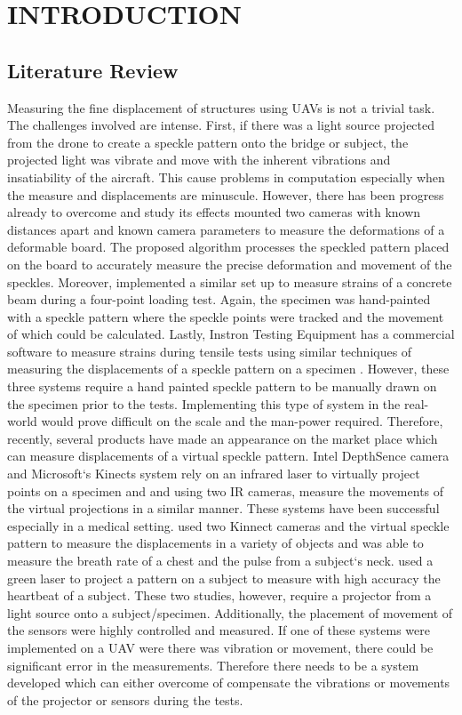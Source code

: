 \documentclass{sigchi}
\begin{document}
\section{INTRODUCTION}

\subsection{Literature Review}

Measuring the fine displacement of structures using UAVs is not a trivial task. The challenges involved are intense. First, if there was a light source projected from the drone to create a speckle pattern onto the bridge or subject, the projected light was vibrate and move with the inherent vibrations and insatiability of the aircraft. This cause problems in computation especially when the measure and displacements are minuscule. However, there has been progress already to overcome and study its effects \cite{Baqersad2019Development} mounted two cameras with known distances apart and known camera parameters to measure the deformations of a deformable board. The proposed algorithm processes the speckled pattern placed on the board to accurately measure the precise deformation and movement of the speckles. Moreover, \cite{KalaitzakisDynamicDrone} implemented a similar set up to measure strains of a concrete beam during a four-point loading test. Again, the specimen was hand-painted with a speckle pattern where the speckle points were tracked and the movement of which could be calculated. Lastly, Instron Testing Equipment has a commercial software to measure strains during tensile tests using similar techniques of measuring the displacements of a speckle pattern on a specimen \cite{InstronDICSoftware}. However, these three systems require a hand painted speckle pattern to be manually drawn on the specimen prior to the tests. Implementing this type of system in the real-world would prove difficult on the scale and the man-power required. Therefore, recently, several products have made an appearance on the market place which can measure displacements of a virtual speckle pattern. Intel DepthSence camera and Microsoft`s Kinects system rely on an infrared laser to virtually project points on a specimen and and using two IR cameras, measure the movements of the virtual projections in a similar manner. These systems have been successful especially in a medical setting. \cite{Nguyen2018} used two Kinnect cameras and the virtual speckle pattern to measure the displacements in a variety of objects and was able to measure the breath rate of a chest and the pulse from a subject`s neck. \cite{Aoki2018StudySensor} used a green laser to project a pattern on a subject to measure with high accuracy the heartbeat of a subject. These two studies, however, require a projector from a light source onto a subject/specimen. Additionally, the placement of movement of the sensors were highly controlled and measured. If one of these systems were implemented on a UAV were there was vibration or movement, there could be significant error in the measurements. Therefore there needs to be a system developed which can either overcome of compensate the vibrations or movements of the projector or sensors during the tests. 
\end{document}

